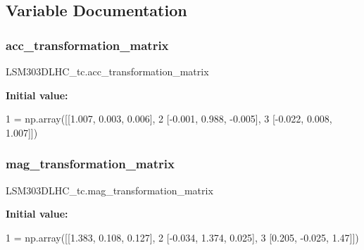 \subsection{Variable Documentation}
\mbox{\label{namespaceLSM303DLHC__tc_a4f264070c04c16ab9411e7fa61f10c34}} 
\subsubsection{\texorpdfstring{acc\+\_\+transformation\+\_\+matrix}{acc\_transformation\_matrix}}
{\footnotesize\ttfamily L\+S\+M303\+D\+L\+H\+C\+\_\+tc.\+acc\+\_\+transformation\+\_\+matrix}

{\bfseries Initial value\+:}
\begin{DoxyCode}
1 =  np.array([[1.007, 0.003, 0.006], 
2                             [-0.001, 0.988, -0.005], 
3                             [-0.022, 0.008, 1.007]])
\end{DoxyCode}
\mbox{\label{namespaceLSM303DLHC__tc_a1d4f9102ab18225ce070dd935eff9114}} 
\subsubsection{\texorpdfstring{mag\+\_\+transformation\+\_\+matrix}{mag\_transformation\_matrix}}
{\footnotesize\ttfamily L\+S\+M303\+D\+L\+H\+C\+\_\+tc.\+mag\+\_\+transformation\+\_\+matrix}

{\bfseries Initial value\+:}
\begin{DoxyCode}
1 =  np.array([[1.383, 0.108, 0.127], 
2                             [-0.034, 1.374, 0.025], 
3                             [0.205, -0.025, 1.47]])
\end{DoxyCode}
